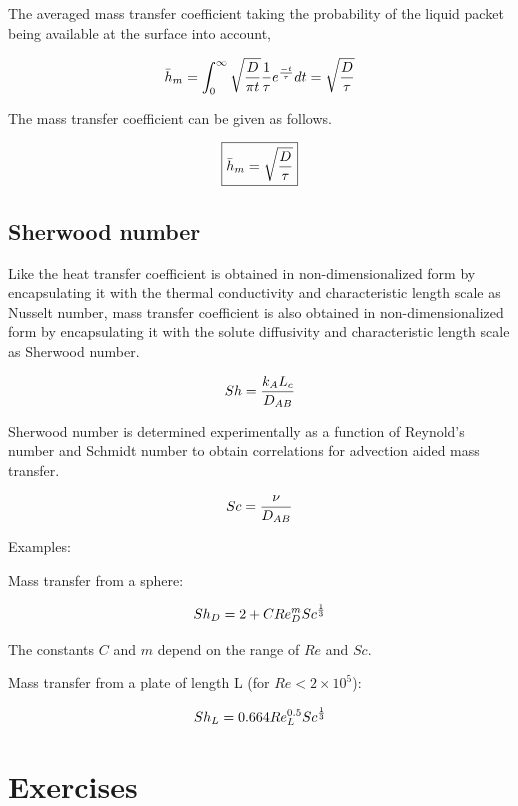 The averaged mass transfer coefficient taking the probability of the liquid packet being available at the surface into account,

$$ \bar{h}_m = \int_{0}^{\infty}{ \sqrt{D \over \pi t} {1 \over \tau} e^{-t\over\tau} dt} = \sqrt{D \over \tau}$$


The mass transfer coefficient can be given as follows.

\begin{equation}
\boxed{
	\bar{h}_m = \sqrt {D \over \tau}
}
\end{equation}


\subsection{Sherwood number}

Like the heat transfer coefficient is obtained in non-dimensionalized form by
encapsulating it with the thermal conductivity and characteristic length scale
as Nusselt number, mass transfer coefficient is also obtained in
non-dimensionalized form by encapsulating it with the solute diffusivity and
characteristic length scale as Sherwood number.

$$ Sh = {k_A L_c \over D_{AB}}$$

Sherwood number is determined experimentally as a function of Reynold's number
and Schmidt number to obtain correlations for advection aided mass transfer.

$$Sc = {\nu \over D_{AB}}$$

Examples:

Mass transfer from a sphere:

$$Sh_D  = 2 + C Re_D^m Sc^{1 \over 3}$$

The constants $C$ and $m$ depend on the range of $Re$ and $Sc$.

Mass transfer from a plate of length L (for $Re < 2 \times 10^5$):

$$ Sh_L = 0.664 Re_L^{0.5} Sc^{1 \over 3}$$ 


\section{Exercises}

